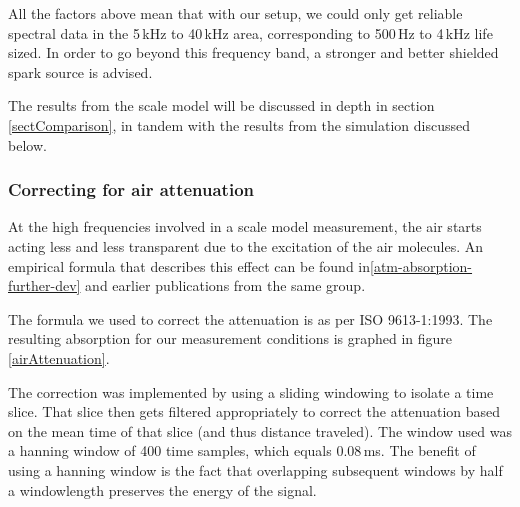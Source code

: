 All the factors above mean that with our setup, we could only get reliable spectral data in the 5\,kHz to 40\,kHz area, corresponding to 500\,Hz to 4\,kHz life sized. In order to go beyond this frequency band, a stronger and better shielded spark source is advised.

The results from the scale model will be discussed in depth in section \ref{sectComparison}, in tandem with the results from the simulation discussed below.



\subsubsection*{Correcting for air attenuation}
At the high frequencies involved in a scale model measurement, the air starts acting less and less transparent due to the excitation of the air molecules. An empirical formula that describes this effect can be found in\ref{atm-absorption-further-dev} and earlier publications from the same group.

The formula we used to correct the attenuation is as per ISO 9613-1:1993. The resulting absorption for our measurement conditions is graphed in figure \ref{airAttenuation}.


The correction was implemented by using a sliding windowing to isolate a time slice. That slice then gets filtered appropriately to correct the attenuation based on the mean time of that slice (and thus distance traveled). The window used was a hanning window of 400 time samples, which equals 0.08\,ms. The benefit of using a hanning window is the fact that overlapping subsequent windows by half a windowlength preserves the energy of the signal.




